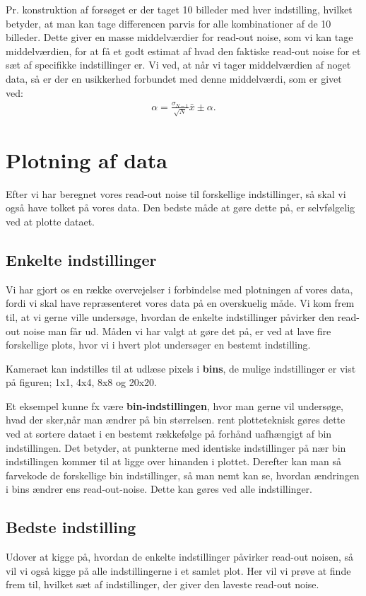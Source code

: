 \documentclass[working]{tuftebook}
\begin{document}
Pr. konstruktion af forsøget er der taget 10 billeder med hver indstilling, hvilket betyder, at man kan tage differencen parvis for alle kombinationer af de 10 billeder. Dette giver en masse middelværdier for read-out noise, som vi kan tage middelværdien, for at få et godt estimat af hvad den faktiske read-out noise for et sæt af specifikke indstillinger er. Vi ved, at når vi tager middelværdien af noget data, så er der en usikkerhed forbundet med denne middelværdi, som er givet ved:
\begin{align*}
\alpha = \frac{\sigma_{N-1}}{\sqrt{N}}
\bar{x}\pm \alpha
.\end{align*}
\section{Plotning af data}
Efter vi har beregnet vores read-out noise til forskellige indstillinger, så skal vi også have tolket på vores data. Den bedste måde at gøre dette på, er selvfølgelig ved at plotte dataet. 

\subsection{Enkelte indstillinger}
Vi har gjort os en række overvejelser i forbindelse med plotningen af vores data, fordi vi skal have repræsenteret vores data på en overskuelig måde. Vi kom frem til, at vi gerne ville undersøge, hvordan de enkelte indstillinger påvirker den read-out noise man får ud. Måden vi har valgt at gøre det på, er ved at lave fire forskellige plots, hvor vi i hvert plot undersøger en bestemt indstilling. 
\\
\begin{marginfigure}[-100pt]
    \centering
    \caption{Kameraet kan indstilles til at udlæse pixels i \textbf{bins}, de mulige indstillinger er vist på figuren; 1x1, 4x4, 8x8 og 20x20. }
    \label{fig:bins}
\end{marginfigure}
Et eksempel kunne fx være \textbf{bin-indstillingen}, hvor man gerne vil undersøge, hvad der sker,når man ændrer på bin størrelsen. rent plotteteknisk gøres dette ved at sortere dataet i en bestemt rækkefølge på forhånd uafhængigt af bin indstillingen. Det betyder, at punkterne med identiske indstillinger på nær bin indstillingen kommer til at ligge over hinanden i plottet. Derefter kan man så farvekode de forskellige bin indstillinger, så man nemt kan se, hvordan ændringen i bins ændrer ens read-out-noise. Dette kan gøres ved alle indstillinger.
\subsection{Bedste indstilling}
Udover at kigge på, hvordan de enkelte indstillinger påvirker read-out noisen, så  vil vi også kigge på alle indstillingerne i et samlet plot. Her vil vi prøve at finde frem til, hvilket sæt af indstillinger, der giver den laveste read-out noise.
\end{document}
